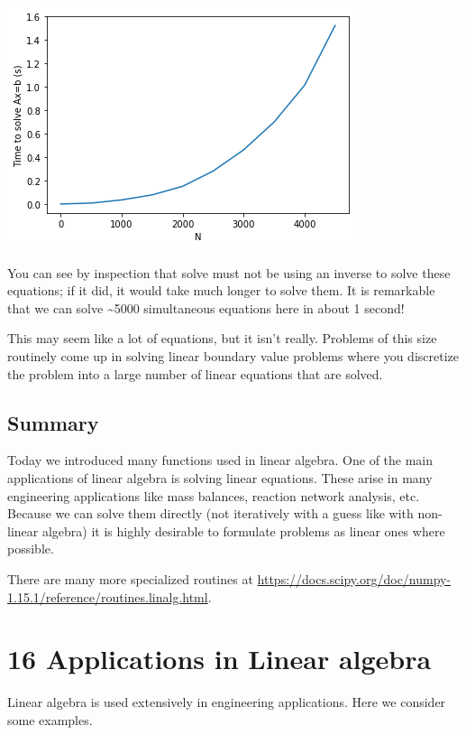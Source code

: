 \documentclass[11pt]{article}
\begin{document}
\begin{center}
\includegraphics[width=.9\linewidth]{obipy-resources/d9c35b77cdd76b0df36e56b4fdad927c-65837CSs.png}
\end{center}

You can see by inspection that solve must not be using an inverse to solve these equations; if it did, it would take much longer to solve them. It is remarkable that we can solve \textasciitilde{}5000 simultaneous equations here in about 1 second!

This may seem like a lot of equations, but it isn't really. Problems of this size routinely come up in solving linear boundary value problems where you discretize the problem into a large number of linear equations that are solved.

\subsection{Summary}
\label{sec:org0508b8b}

Today we introduced many functions used in linear algebra. One of the main applications of linear algebra is solving linear equations. These arise in many engineering applications like mass balances, reaction network analysis, etc. Because we can solve them directly (not iteratively with a guess like with non-linear algebra) it is highly desirable to formulate problems as linear ones where possible.

There are many more specialized routines at \url{https://docs.scipy.org/doc/numpy-1.15.1/reference/routines.linalg.html}.

\section{16 Applications in Linear algebra}
\label{sec:org00a5d4b}
Linear algebra is used extensively in engineering applications. Here we consider some examples.
\end{document}

